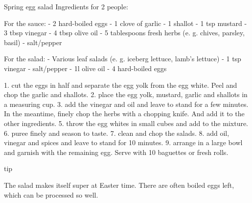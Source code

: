 
Spring egg salad
Ingredients for 2 people:

For the sauce:
- 2 hard-boiled eggs
- 1 clove of garlic
- 1 shallot
- 1 tsp mustard
- 3 tbsp vinegar
- 4 tbsp olive oil
- 5 tablespoons fresh herbs (e. g. chives, parsley, basil)
- salt/pepper

For the salad:
- Various leaf salads (e. g. iceberg lettuce, lamb's lettuce)
- 1 tsp vinegar
- salt/pepper
- 1l olive oil
- 4 hard-boiled eggs


1. cut the eggs in half and separate the egg yolk from the egg white. Peel and chop the garlic and shallots.
2. place the egg yolk, mustard, garlic and shallots in a measuring cup.
3. add the vinegar and oil and leave to stand for a few minutes.
In the meantime, finely chop the herbs with a chopping knife. And add it to the other ingredients.
5. throw the egg whites in small cubes and add to the mixture.
6. puree finely and season to taste.
7. clean and chop the salads.
8. add oil, vinegar and spices and leave to stand for 10 minutes.
9. arrange in a large bowl and garnish with the remaining egg.
Serve with 10 baguettes or fresh rolls.

tip

The salad makes itself super at Easter time. There are often boiled eggs left, which can be processed so well.
